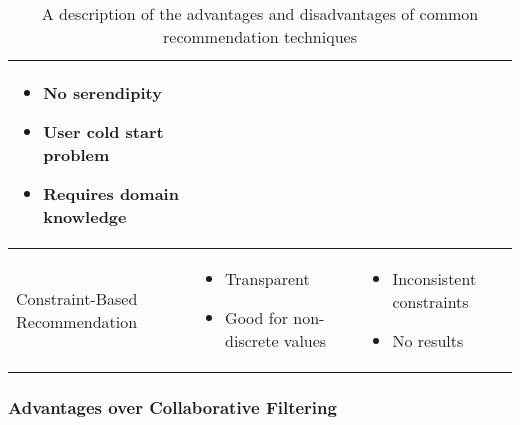 \begin{table}
\begin{center}
\begin{tabularx}{\columnwidth}{X|X|X}
\begin{itemize}[noitemsep,topsep=0pt,parsep=0pt,partopsep=0pt, leftmargin=3.5mm]
                    \item No serendipity
                    \item User cold start problem
                    \item Requires domain knowledge
                \end{itemize} \\
            \hline
            Constraint-Based Recommendation 
            &   \begin{itemize}[noitemsep,topsep=0pt,parsep=0pt,partopsep=0pt, leftmargin=3.5mm]
                    \item Transparent
                    \item Good for non-discrete values
                \end{itemize}
            &   \begin{itemize}[noitemsep,topsep=0pt,parsep=0pt,partopsep=0pt, leftmargin=3.5mm]
                    \item Inconsistent constraints
                    \item No results
                \end{itemize} \\ 
        \end{tabularx}
        \caption[Comparison of Recommendation Approaches]{A description of the advantages and disadvantages of common recommendation techniques \cite{richthammerSituationAwarenessRecommender2018, shokeenStudyFeaturesSocial2019,hahslerRecommenderlabFrameworkDeveloping2015, aminiDiscoveringImpactKnowledge2011, suSurveyCollaborativeFiltering2009}}
        \label{tab:Foundations:RecommenderComparison}
    \end{center}
\end{table}

\subsubsection{Advantages over Collaborative Filtering}


